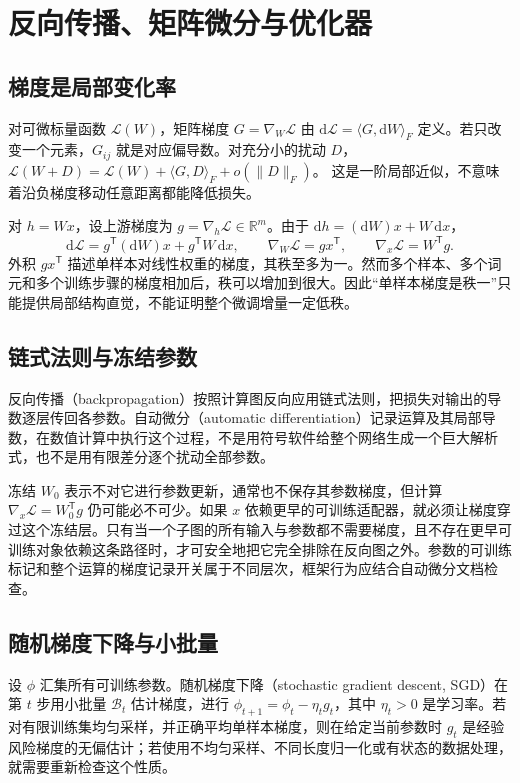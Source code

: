 \documentclass[UTF8,12pt,a4paper,fontset=fandol]{ctexart}
\begin{document}
\section{反向传播、矩阵微分与优化器}
\label{sec:backprop}

\subsection{梯度是局部变化率}

对可微标量函数 $\mathcal L(W)$，矩阵梯度 $G=\nabla_W\mathcal L$ 由
$\mathrm d\mathcal L=\langle G,\mathrm dW\rangle_F$ 定义。若只改变一个元素，$G_{ij}$ 就是对应偏导数。对充分小的扰动 $D$，
$\mathcal L(W+D)=\mathcal L(W)+\langle G,D\rangle_F+o(\|D\|_F)$。
这是一阶局部近似，不意味着沿负梯度移动任意距离都能降低损失。

对 $h=Wx$，设上游梯度为 $g=\nabla_h\mathcal L\in\mathbb R^m$。由于
$\mathrm dh=(\mathrm dW)x+W\,\mathrm dx$，
\[
\mathrm d\mathcal L
=g^{\mathsf T}(\mathrm dW)x+g^{\mathsf T}W\,\mathrm dx,
\qquad
\nabla_W\mathcal L=gx^{\mathsf T},
\qquad
\nabla_x\mathcal L=W^{\mathsf T}g.
\]
外积 $gx^{\mathsf T}$ 描述单样本对线性权重的梯度，其秩至多为一。然而多个样本、多个词元和多个训练步骤的梯度相加后，秩可以增加到很大。因此“单样本梯度是秩一”只能提供局部结构直觉，不能证明整个微调增量一定低秩。

\subsection{链式法则与冻结参数}

反向传播（backpropagation）按照计算图反向应用链式法则，把损失对输出的导数逐层传回各参数。自动微分（automatic differentiation）记录运算及其局部导数，在数值计算中执行这个过程，不是用符号软件给整个网络生成一个巨大解析式，也不是用有限差分逐个扰动全部参数。

冻结 $W_0$ 表示不对它进行参数更新，通常也不保存其参数梯度，但计算 $\nabla_x\mathcal L=W_0^{\mathsf T}g$ 仍可能必不可少。如果 $x$ 依赖更早的可训练适配器，就必须让梯度穿过这个冻结层。只有当一个子图的所有输入与参数都不需要梯度，且不存在更早可训练对象依赖这条路径时，才可安全地把它完全排除在反向图之外。参数的可训练标记和整个运算的梯度记录开关属于不同层次，框架行为应结合自动微分文档检查\cite{pytorch-autograd}。

\subsection{随机梯度下降与小批量}

设 $\phi$ 汇集所有可训练参数。随机梯度下降（stochastic gradient descent, SGD）在第 $t$ 步用小批量 $\mathcal B_t$ 估计梯度，进行
$\phi_{t+1}=\phi_t-\eta_tg_t$，其中 $\eta_t>0$ 是学习率。若对有限训练集均匀采样，并正确平均单样本梯度，则在给定当前参数时 $g_t$ 是经验风险梯度的无偏估计；若使用不均匀采样、不同长度归一化或有状态的数据处理，就需要重新检查这个性质。
\end{document}
